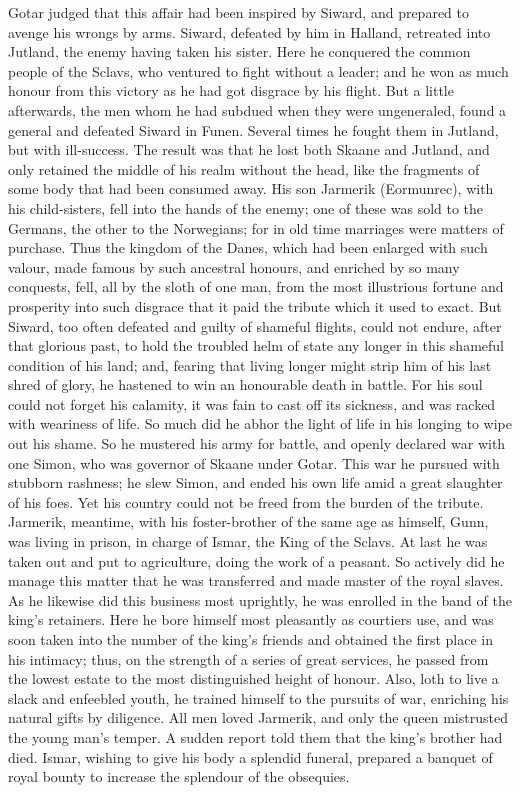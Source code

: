 \documentclass[10pt,a4paper]{report}
\begin{document}
Gotar judged that this affair had been inspired by Siward, and prepared to avenge his wrongs by arms. Siward, defeated by him in Halland, retreated into Jutland, the enemy having taken his sister. Here he conquered the common people of the Sclavs, who ventured to fight without a leader; and he won as much honour from this victory as he had got disgrace by his flight. But a little afterwards, the men whom he had subdued when they were ungeneraled, found a general and defeated Siward in Funen. Several times he fought them in Jutland, but with ill-success. The result was that he lost both Skaane and Jutland, and only retained the middle of his realm without the head, like the fragments of some body that had been consumed away. His son Jarmerik (Eormunrec), with his child-sisters, fell into the hands of the enemy; one of these was sold to the Germans, the other to the Norwegians; for in old time marriages were matters of purchase. Thus the kingdom of the Danes, which had been enlarged with such valour, made famous by such ancestral honours, and enriched by so many conquests, fell, all by the sloth of one man, from the most illustrious fortune and prosperity into such disgrace that it paid the tribute which it used to exact. But Siward, too often defeated and guilty of shameful flights, could not endure, after that glorious past, to hold the troubled helm of state any longer in this shameful condition of his land; and, fearing that living longer might strip him of his last shred of glory, he hastened to win an honourable death in battle. For his soul could not forget his calamity, it was fain to cast off its sickness, and was racked with weariness of life. So much did he abhor the light of life in his longing to wipe out his shame. So he mustered his army for battle, and openly declared war with one Simon, who was governor of Skaane under Gotar. This war he pursued with stubborn rashness; he slew Simon, and ended his own life amid a great slaughter of his foes. Yet his country could not be freed from the burden of the tribute.\\

Jarmerik, meantime, with his foster-brother of the same age as himself, Gunn, was living in prison, in charge of Ismar, the King of the Sclavs. At last he was taken out and put to agriculture, doing the work of a peasant. So actively did he manage this matter that he was transferred and made master of the royal slaves. As he likewise did this business most uprightly, he was enrolled in the band of the king's retainers. Here he bore himself most pleasantly as courtiers use, and was soon taken into the number of the king's friends and obtained the first place in his intimacy; thus, on the strength of a series of great services, he passed from the lowest estate to the most distinguished height of honour. Also, loth to live a slack and enfeebled youth, he trained himself to the pursuits of war, enriching his natural gifts by diligence. All men loved Jarmerik, and only the queen mistrusted the young man's temper. A sudden report told them that the king's brother had died. Ismar, wishing to give his body a splendid funeral, prepared a banquet of royal bounty to increase the splendour of the obsequies.\\
\end{document}
